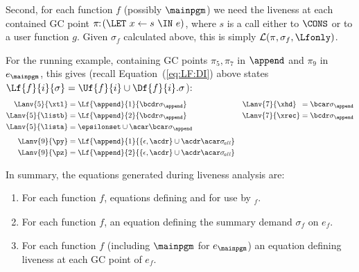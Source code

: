 Second, for each function $f$ (possibly $\mainpgm$) we need the liveness at
each contained GC point
$\pi\!\!:\!(\LET~x \leftarrow s~\IN~e)$,
where $s$ is a call either to $\CONS$ or to a user function $g$.
Given $\sigma_f$ calculated above, this
is simply $\mathcal{L}(\pi,\sigma_f,\Lfonly)$.

For the running example, containing GC points $\pi_5, \pi_7$ in $\append$ and
$\pi_9$ in $e_\mainpgm$, this gives
(recall Equation~(\ref{eq:LF:DI}) above states $\Lf{f}{i}{\sigma} = \Uf{f}{i} \cup \Df{f}{i}.\sigma$):
\begin{align*}
\Lanv{5}{\xtl} &= \Lf{\append}{1}{\bcdr\sigma_{\append}}  \quad &
                                \Lanv{7}{\xhd}\,\,\, &=  \bcar\sigma_{\append}     \\ 
\Lanv{5}{\listb} &= \Lf{\append}{2}{\bcdr\sigma_{\append}} &
                                \Lanv{7}{\xrec} &=  \bcdr\sigma_{\append} \\
\Lanv{5}{\lista} &= \epsilonset \cup \acar\bcar\sigma_{\append} 
\\[1ex]
  \Lanv{9}{\py}  &= \Lf{\append}{1}{\{\epsilon,
    \acdr\} \cup \acdr\acar\sigma_{\mathit{\!all}}} \\
  \Lanv{9}{\pz}  &= \Lf{\append}{2}{\{\epsilon,
    \acdr\} \cup \acdr\acar\sigma_{\mathit{\!all}}}
\end{align*}

\noindent 
In summary, the equations generated during liveness analysis are:
\begin{enumerate}
\item   For    each   function   $\mathit{f}$,    equations   defining
 and  for use by \Lfonly$_{\mathit f}$.
\item  For  each   function  $\mathit{f}$, an  equation  defining
the summary demand  $\sigma_{\mathit f}$ on $e_f$.
\item For each function $\mathit{f}$ (including $\mainpgm$ for $e_\mainpgm$)
an equation defining
  liveness at each GC point of $e_{\mathit f}$.
\end{enumerate}



